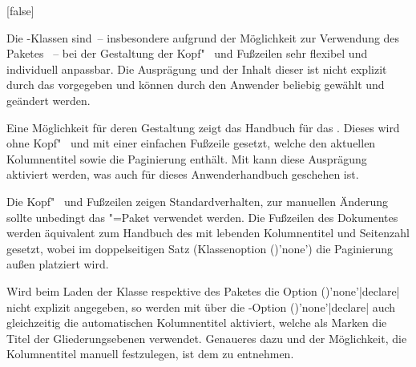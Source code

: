 \begin{Declaration*}{}
\begin{Declaration*}{}
\begin{Declaration*}{}
\begin{Declaration}[%
  v2.03!\Option{cdfoot=color}:farbiger Hintergrund der Fußzeile;%
  v2.03!\Option{cdfoot=\PValueName{Höhe}};%
]{}[false]%
\printdeclarationlist%
%
%
%

Die \TUDScript-Klassen sind~-- insbesondere aufgrund der Möglichkeit zur 
Verwendung des Paketes ~-- bei der Gestaltung der 
Kopf"~ und Fußzeilen sehr flexibel und individuell anpassbar. Die Ausprägung 
und der Inhalt dieser ist nicht explizit durch das \CD vorgegeben und können 
durch den Anwender beliebig gewählt und geändert werden. 

Eine Möglichkeit für deren Gestaltung zeigt das Handbuch für das \TUDCD. Dieses 
wird ohne Kopf"~ und mit einer einfachen Fußzeile gesetzt, welche den aktuellen 
Kolumnentitel sowie die Paginierung enthält. Mit  kann diese 
Ausprägung aktiviert werden, was auch für dieses Anwenderhandbuch geschehen ist.
%
\begin{values}{}
\itemfalse
  Die Kopf"~ und Fußzeilen zeigen Standardverhalten, zur manuellen Änderung 
  sollte unbedingt das \KOMAScript"=Paket  verwendet 
  werden.
\itemtrue*
  Die Fußzeilen des Dokumentes werden äquivalent zum Handbuch des \TUDCDs mit 
  lebenden Kolumnentitel und Seitenzahl gesetzt, wobei im doppelseitigen Satz 
  (Klassenoption ()'none') die 
  Paginierung außen platziert wird.
\end{values}
%
Wird beim Laden der Klasse respektive des Paketes  
die Option ()'none'|declare| nicht 
explizit angegeben, so werden mit  über die 
\KOMAScript-Option ()'none'|declare| 
auch gleichzeitig die automatischen Kolumnentitel aktiviert, welche als Marken 
die Titel der Gliederungsebenen verwendet. Genaueres dazu und der Möglichkeit, 
die Kolumnentitel manuell festzulegen, ist dem \scrguide zu entnehmen.


\end{Declaration}
\end{Declaration*}
\end{Declaration*}
\end{Declaration*}

